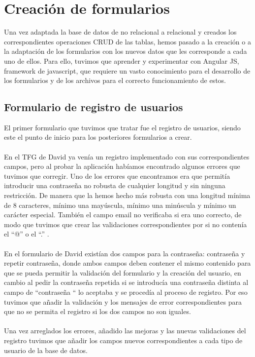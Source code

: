 \documentclass[11pt]{article}
\begin{document}

\tableofcontents
\newpage

\section{Creación de formularios}
Una vez adaptada la base de datos de no relacional a relacional y creados los correspondientes operaciones CRUD de las tablas, hemos pasado a la creación o a la adaptación de los formularios con los nuevos datos que les corresponde a cada uno de ellos. Para ello, tuvimos que aprender y experimentar con Angular JS, framework de javascript, que requiere un vasto conocimiento para el desarrollo de los formularios y de los archivos para el correcto funcionamiento de estos. 
\subsection{Formulario de registro de usuarios}
El primer formulario que tuvimos que tratar fue el registro de usuarios, siendo este el punto de inicio para los posteriores formularios a crear.\\\\
En el TFG de David ya venía un registro implementado con sus correspondientes campos, pero al probar la aplicación habíamos encontrado algunos errores que tuvimos que corregir. Uno de los errores que encontramos era que permitía introducir una contraseña no robusta de cualquier longitud y sin ninguna restricción. De manera que la hemos hecho más robusta con una longitud mínima de 8 caracteres, mínimo una mayúscula, mínimo una minúscula y mínimo un carácter especial. También el campo email no verificaba si era uno  correcto, de modo que tuvimos que crear las validaciones correspondientes por si no contenía el “@” o el “.” .\\\\
 En el formulario de David existían dos campos para la contraseña: contraseña y repetir contraseña, donde ambos campos deben contener el mismo contenido para que se pueda permitir la validación del formulario y la creación del usuario, en cambio al pedir la contraseña repetida si se introducía una contraseña distinta al campo de “contraseña “ lo aceptaba y se procedía al proceso de registro. Por eso tuvimos que añadir la validación y los mensajes de error correspondientes para que no se permita el registro si los dos campos no son iguales.\\\\
Una vez arreglados los errores, añadido las mejoras y las nuevas validaciones del registro tuvimos que añadir los campos nuevos correspondientes a cada tipo de usuario de la base de datos. \\\\
\end{document}
